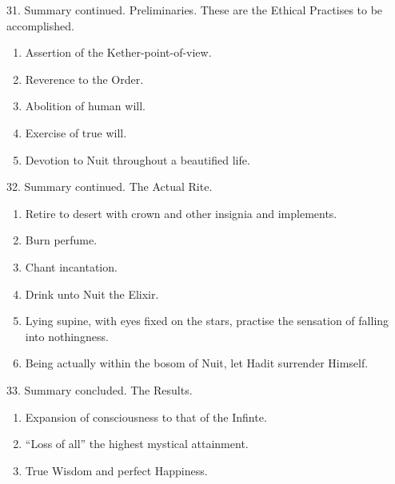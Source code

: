 31. Summary continued. Preliminaries. These are the Ethical Practises to be accomplished.
\begin{enumerate}[leftmargin=4\parindent]
\item Assertion of the Kether-point-of-view.
\item Reverence to the Order. 
\item Abolition of human will.
\item Exercise of true will.
\item Devotion to Nuit throughout a beautified life.
\end{enumerate}

32. Summary continued. The Actual Rite.
\begin{enumerate}[leftmargin=4\parindent]
\item Retire to desert with crown and other insignia and implements.
\item Burn perfume.
\item Chant incantation.
\item Drink unto Nuit the Elixir.
\item Lying supine, with eyes fixed on the stars, practise the sensation of falling into nothingness.
\item Being actually within the bosom of Nuit, let Hadit surrender Himself.
\end{enumerate}

33. Summary concluded. The Results.
\begin{enumerate}[leftmargin=4\parindent]
\item Expansion of consciousness to that of the Infinte.
\item \enquote{Loss of all} the highest mystical attainment.
\item True Wisdom and perfect Happiness. 
\end{enumerate}

